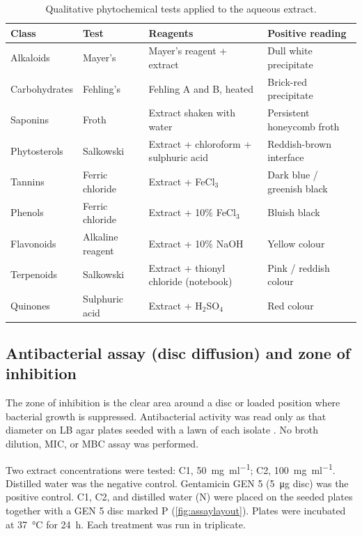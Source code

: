 \begin{table}[htbp]
\centering
\caption{Qualitative phytochemical tests applied to the aqueous extract.}
\label{tab:phyto_methods}
\small
\begin{tabular}{@{}>{\raggedright\arraybackslash}p{}
  >{\raggedright\arraybackslash}p{}
  >{\raggedright\arraybackslash}p{}
  >{\raggedright\arraybackslash}p{}@{}}
\toprule
\textbf{Class} & \textbf{Test} & \textbf{Reagents} & \textbf{Positive reading} \\
\midrule
Alkaloids & Mayer's & Mayer's reagent + extract & Dull white precipitate \\
Carbohydrates & Fehling's & Fehling A and B, heated & Brick-red precipitate \\
Saponins & Froth & Extract shaken with water & Persistent honeycomb froth \\
Phytosterols & Salkowski & Extract + chloroform + sulphuric acid & Reddish-brown interface \\
Tannins & Ferric chloride & Extract + FeCl$_3$ & Dark blue / greenish black \\
Phenols & Ferric chloride & Extract + 10\% FeCl$_3$ & Bluish black \\
Flavonoids & Alkaline reagent & Extract + 10\% NaOH & Yellow colour \\
Terpenoids & Salkowski & Extract + thionyl chloride (notebook) & Pink / reddish colour \\
Quinones & Sulphuric acid & Extract + H$_2$SO$_4$ & Red colour \\
\bottomrule
\end{tabular}
\end{table}

\subsection{Antibacterial assay (disc diffusion) and zone of inhibition}

The zone of inhibition is the clear area around a disc or loaded position where bacterial growth is suppressed. Antibacterial activity was read only as that diameter on LB agar plates seeded with a lawn of each isolate \citep{balouiri2016methods,bauer1966antibiotic,clsi2024m100}. No broth dilution, MIC, or MBC assay was performed.

Two extract concentrations were tested: C1, \SI{50}{\milli\gram\per\milli\litre}; C2, \SI{100}{\milli\gram\per\milli\litre}. Distilled water was the negative control. Gentamicin GEN 5 (\SI{5}{\micro\gram} disc) was the positive control. C1, C2, and distilled water (N) were placed on the seeded plates together with a GEN 5 disc marked P (\cref{fig:assaylayout}). Plates were incubated at \SI{37}{\celsius} for \SI{24}{\hour}. Each treatment was run in triplicate.

